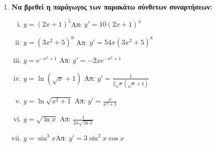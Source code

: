 \begin{enumerate}
\item {\bfseries Να βρεθεί η παράγωγος των παρακάτω σύνθετων συναρτήσεων:}

\begin{enumerate}[i)]
\item $y=(2x+1)^5$\hfill Απ: $y'=10(2x+1)^4$
\item $ y=(3x^{2}+5)^{9} $ \hfill Απ: $ y'=54x(3x^{2}+5)^{8} $ 
\item $ y=e^{-x^{2}+1} $ \hfill Απ: $ y'=-2x e^{-x^{2}+1} $ 
\item $ y= \ln{(\sqrt{ x } +1)} $ \hfill Απ: $ y'= \frac{1}{2 \sqrt{ x } (\sqrt{ x } +1)} $ 
\item $y= \ln{\sqrt{x^{2}+1}} $ \hfill Απ: $ y'= \frac{x}{x^{2}+1} $ 
\item $ y= \sqrt{ \ln{x} } $ \hfill Απ: $ \frac{1}{2x \sqrt{ \ln{x} }} $ 
\item $y=\sin^3 x$\hfill Απ: $y'=3\sin^2x \cos x$
\end{enumerate}


	


	
	
\end{enumerate}


